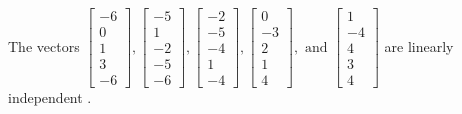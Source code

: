 \begin{exercise}
\begin{exerciseStatement}
  \end{exerciseStatement}
  \begin{exerciseAnswer}
   The vectors \(\left[\begin{array}{r}
-6 \\
0 \\
1 \\
3 \\
-6
\end{array}\right] , \left[\begin{array}{r}
-5 \\
1 \\
-2 \\
-5 \\
-6
\end{array}\right] , \left[\begin{array}{r}
-2 \\
-5 \\
-4 \\
1 \\
-4
\end{array}\right] , \left[\begin{array}{r}
0 \\
-3 \\
2 \\
1 \\
4
\end{array}\right] , \text{ and } \left[\begin{array}{r}
1 \\
-4 \\
4 \\
3 \\
4
\end{array}\right]\) are 
  	 linearly independent  .
  


  \end{exerciseAnswer}
\end{exercise}
